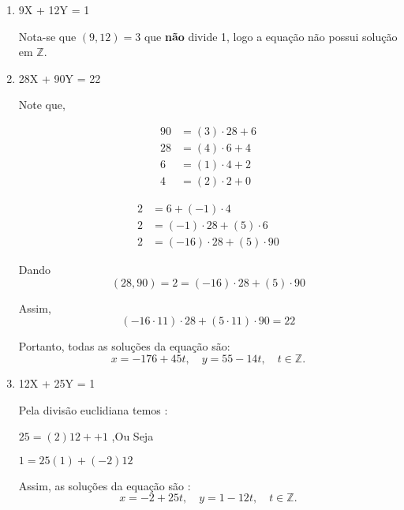 \begin{enumerate}
    \item 9X + 12Y = 1
     
    Nota-se que $(9,12) = 3$ que \textbf{não} divide 1, logo a equação não possui solução em $\mathbb{Z}$. 
    
    \item 28X + 90Y = 22
    
    Note que,
    \begin{minipage}[t]{0.45\linewidth}
        \begin{align*}
                90 &= (3)\cdot 28 + 6 \\
                28 &= (4)\cdot 6 + 4 \\
                6  &= (1)\cdot 4 + 2 \\
                4  &= (2)\cdot 2 + 0
        \end{align*}
    \end{minipage}\hfill
    \begin{minipage}[t]{0.45\linewidth}
        \begin{align*}
            2  &= 6 + (-1)\cdot 4 \\
            2  &= (-1)\cdot 28 + (5)\cdot 6 \\
            2  &= (-16)\cdot 28 + (5)\cdot 90
        \end{align*}
    \end{minipage}

    Dando 
    \[
        (28,90) = 2 = (-16)\cdot 28 + (5)\cdot 90
    \]

    Assim, 
    \[
        (-16 \cdot 11)\cdot 28 + (5 \cdot 11)\cdot 90 = 22
    \]

    Portanto, todas as soluções da equação são:
    \[
        x = -176 + 45t, \quad y = 55 - 14t, \quad t \in \mathbb{Z}.
    \]

    \item 12X + 25Y = 1
    
    Pela divisão euclidiana temos : 
    
    $25 = (2)12 + + 1$ ,Ou Seja
    
    $1 = 25(1) + (-2)12$
    
    Assim, as soluções da equação são : 
    \[
        x = -2 + 25t, \quad y = 1 - 12t, \quad t \in \mathbb{Z}.
    \]

\end{enumerate}
